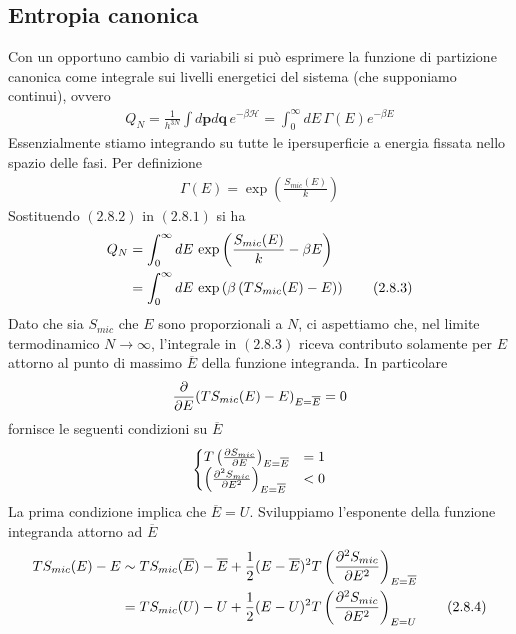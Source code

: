 \documentclass{article}
\begin{document}
\subsection{Entropia canonica}
Con un opportuno cambio di variabili si può esprimere la funzione di partizione canonica come integrale sui livelli energetici del sistema (che supponiamo continui), ovvero
\begin{align}
    Q_N = \frac{1}{h^{3N}}\int d\mathbf{p}d\mathbf{q} \, e^{-\beta\mathcal{H}} = \int_0^\infty dE \, \Gamma(E)e^{-\beta E} \tag{2.8.1}
\end{align}
Essenzialmente stiamo integrando su tutte le ipersuperficie a energia fissata nello spazio delle fasi. Per definizione 
\begin{align}
    \Gamma(E) = \exp\left(\frac{S_{mic}(E)}{k}\right) \tag{2.8.2}
\end{align}
Sostituendo $(2.8.2)$ in $(2.8.1)$ si ha 
\begin{align}
    Q_N &= \int_0^\infty dE \, \exp\left(\frac{S_{mic}(E)}{k} - \beta E\right) \notag \\
    &= \int_0^\infty dE \, \exp\left(\beta\left(TS_{mic}(E) - E\right)\right) \tag{2.8.3}
\end{align}
Dato che sia $S_{mic}$ che $E$ sono proporzionali a $N$, ci aspettiamo che, nel limite termodinamico $N \rightarrow \infty$, l'integrale in $(2.8.3)$ riceva contributo solamente per $E$ attorno al punto di massimo $\overline{E}$ della funzione integranda. In particolare 
\begin{align}
    \frac{\partial}{\partial E}(TS_{mic}(E) - E)_{E = \overline{E}} = 0 \notag
\end{align}
fornisce le seguenti condizioni su $\overline{E}$
\begin{align}
    \begin{cases}
        T\left(\frac{\partial S_{mic}}{\partial E}\right)_{E = \overline{E}} &= 1 \\
        \left(\frac{\partial^2S_{mic}}{\partial E^2}\right)_{E = \overline{E}} &< 0
    \end{cases} \notag
\end{align}
La prima condizione implica che $\overline{E} = U$. Sviluppiamo l'esponente della funzione integranda attorno ad $\overline{E}$
\begin{align}
    TS_{mic}(E) - E &\sim TS_{mic}(\overline{E}) - \overline{E} + \frac{1}{2}(E - \overline{E})^2T\left(\frac{\partial^2S_{mic}}{\partial E^2}\right)_{E = \overline{E}} \notag \\
    &= TS_{mic}(U) - U + \frac{1}{2}(E - U)^2T\left(\frac{\partial^2S_{mic}}{\partial E^2}\right)_{E = U} \tag{2.8.4}
\end{align}
\end{document}
